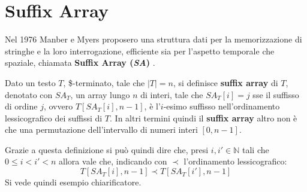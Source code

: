 \section{Suffix Array}
Nel 1976 Manber e Myers proposero una struttura dati per la memorizzazione di
stringhe e la loro interrogazione, efficiente sia per
l'aspetto temporale che spaziale, chiamata \textbf{Suffix Array (\textit{SA})}
\cite{sa}.
\begin{definizione}
  Dato un testo $T$, \$-terminato, tale che $|T|=n$, si definisce \textbf{suffix
    array} di $T$, denotato con $SA_T$, un array lungo $n$ di interi, tale che
  $SA_T[i]=j$ sse il suffisso di ordine $j$, ovvero $T[SA_T[i],n-1]$, è
  l'$i$-esimo suffisso nell’ordinamento lessicografico dei suffissi di $T$. In
  altri termini quindi il \textbf{suffix array} altro non è che una permutazione
  dell'intervallo di numeri interi $[0,n-1]$.
\end{definizione}
Grazie a questa definizione si può quindi dire che, presi $i,i'\in \mathbb{N}$
tali che $0\leq i < i' < n$ allora vale che, indicando con $\prec$
l'ordinamento lessicografico:
\[T[SA_T[i],n-1] \prec T[SA_T[i'],n-1]\]
Si vede quindi esempio chiarificatore.
